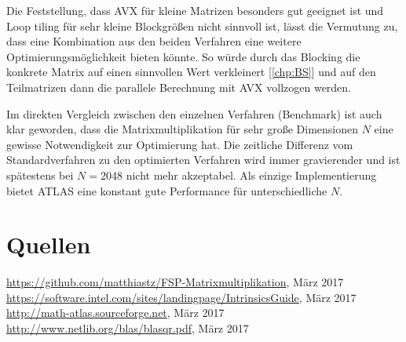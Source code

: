 \documentclass[a4paper,11pt]{scrartcl}
\begin{document}
Die Feststellung, dass AVX für kleine Matrizen besonders gut geeignet ist und 
Loop tiling für sehr kleine Blockgrößen nicht sinnvoll ist, lässt die Vermutung zu,
dass eine Kombination aus den beiden Verfahren eine weitere Optimierungsmöglichkeit 
bieten könnte. So würde durch das Blocking die konkrete Matrix auf einen sinnvollen Wert verkleinert
 [\ref{chp:BS}] und auf den Teilmatrizen dann die parallele Berechnung mit AVX vollzogen werden.
\newline
 
Im direkten Vergleich zwischen den einzelnen Verfahren (Benchmark) ist auch klar geworden, dass die 
Matrixmultiplikation für sehr große Dimensionen $N$ eine gewisse Notwendigkeit zur Optimierung
hat. Die zeitliche Differenz vom Standardverfahren zu den optimierten Verfahren wird immer
gravierender und ist spätestens bei $N=2048$ nicht mehr akzeptabel. Als einzige Implementierung
bietet ATLAS eine konstant gute Performance für unterschiedliche $N$.


\section{Quellen}
\begin{thebibliography}{9}

 \url{https://github.com/matthiastz/FSP-Matrixmultiplikation}, März 2017
 \url{https://software.intel.com/sites/landingpage/IntrinsicsGuide}, März 2017
 \url{http://math-atlas.sourceforge.net}, März 2017
 \url{http://www.netlib.org/blas/blasqr.pdf}, März 2017

\end{thebibliography}
\end{document}
